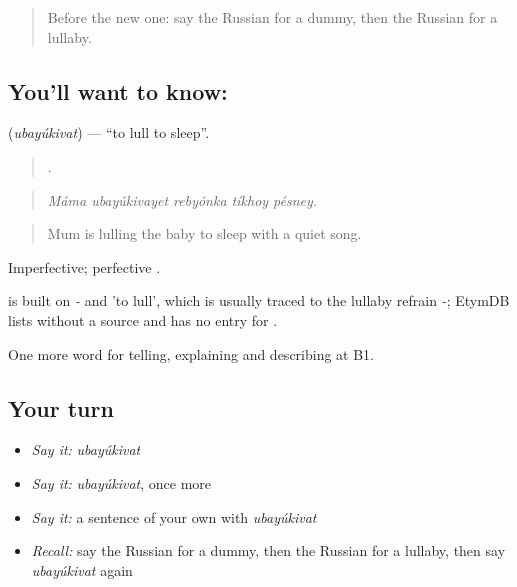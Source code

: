 \label{lesson:RU-C496-ubayukivat}



\begin{quote}
Before the new one: say the Russian for a dummy, then the Russian for a lullaby.
\end{quote}

\subsection*{You'll want to know: }
\textbf{} (\emph{ubayúkivat}) — \textquotedblleft{}to lull to sleep\textquotedblright{}.

\begin{quote}
    .
\end{quote}

\begin{quote}
\emph{Máma ubayúkivayet rebyónka tíkhoy pésney.}
\end{quote}

\begin{quote}
Mum is lulling the baby to sleep with a quiet song.
\end{quote}

Imperfective; perfective .

\begin{cousinweb}
\emph{} is built on \emph{-} and \emph{} 'to lull', which is usually traced to the lullaby refrain \emph{-}; EtymDB lists \emph{} without a source and has no entry for \emph{}.
\end{cousinweb}

\begin{grammarlens}[title={What you've built}]
One more word for telling, explaining and describing at B1.
\end{grammarlens}

\subsection*{Your turn}
\begin{itemize}
\raggedright
  \item \emph{Say it:} \emph{ubayúkivat}
  \item \emph{Say it:} \emph{ubayúkivat}, once more
  \item \emph{Say it:} a sentence of your own with \emph{ubayúkivat}
  \item \emph{Recall:} say the Russian for a dummy, then the Russian for a lullaby, then say \emph{ubayúkivat} again
\end{itemize}

